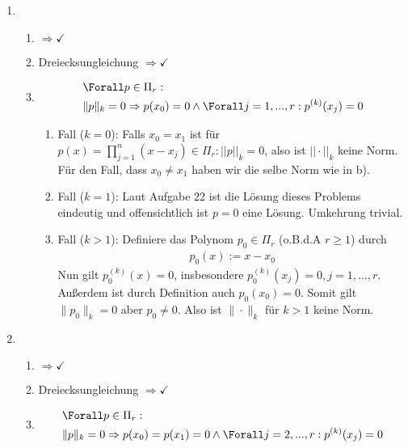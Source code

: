 \begin{solution}
\begin{enumerate}[label = \textbf{\alph*)}]
  \item
  \begin{enumerate}[label = \textit{\roman*)}]
    \item {} $\Rightarrow \checkmark$
    \item Dreiecksungleichung $\Rightarrow \checkmark$
    \item {} \begin{align*}
      &\Forall p \in \Pi_r: \\
      & \|p\|_k = 0 \Rightarrow p(x_0) = 0 \land \Forall j=1,...,r: p^{(k)}(x_j) = 0
    \end{align*}
    \begin{enumerate}[label = \textit{\arabic*.}]
      \item Fall ($k = 0$):
      Falls $x_0 = x_1$ ist für $p(x) = \prod_{j=1}^n (x - x_j) \in \Pi_r: ||p||_k = 0$,
      also ist $||\cdot||_k$ keine Norm. \\
      Für den Fall, dass $x_0 \neq x_1$ haben wir die selbe Norm wie in b).
      \item Fall ($k=1$):
      Laut Aufgabe 22 ist die Lösung dieses Problems eindeutig und offensichtlich ist $p = 0$ eine Lösung.
      Umkehrung trivial.
      \item Fall ($k>1$):
      Definiere das Polynom $p_0 \in \Pi_r$ (o.B.d.A $r \geq 1$) durch
      \begin{align*}
        p_0(x) := x-x_0
      \end{align*}
      Nun gilt $p_0^{(k)}(x) = 0$, insbesondere $p_0^{(k)}(x_j) = 0, j=1,...,r$. Außerdem ist durch Definition auch $p_0(x_0) = 0$.
      Somit gilt $\|p_0\|_k = 0$ aber $p_0 \neq 0$. Also ist $\|\cdot\|_k$ für $k>1$ keine Norm.
    \end{enumerate}
  \end{enumerate}
  \item
  \begin{enumerate}[label = \textit{\roman*)}]
    \item {} $\Rightarrow \checkmark$
    \item Dreiecksungleichung $\Rightarrow \checkmark$
    \item {} \begin{align*}
      &\Forall p \in \Pi_r: \\
      & \|p\|_k = 0 \Rightarrow p(x_0) = p(x_1) = 0 \land \Forall j=2,...,r: p^{(k)}(x_j) = 0
    \end{align*}
    \begin{enumerate}[label = \textit{\arabic*.}]

\end{enumerate}
\end{enumerate}
\end{enumerate}
\end{solution}
